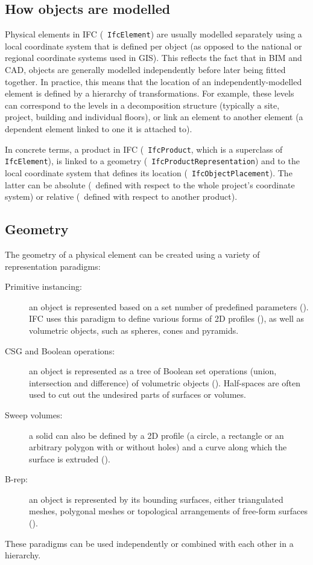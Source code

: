 \subsection{How objects are modelled}

Physical elements in IFC (\ie\ \texttt{IfcElement}) are usually modelled separately using a local coordinate system that is defined per object (as opposed to the national or regional coordinate systems used in GIS).
This reflects the fact that in BIM and CAD, objects are generally modelled independently before later being fitted together.
In practice, this means that the location of an independently-modelled element is defined by a hierarchy of transformations.
For example, these levels can correspond to the levels in a decomposition structure (typically a site, project, building and individual floors), or link an element to another element (a dependent element linked to one it is attached to).

In concrete terms, a product in IFC (\ie\ \texttt{IfcProduct}, which is a superclass of \texttt{IfcElement}), is linked to a geometry (\ie\ \texttt{IfcProductRepresentation}) and to the local coordinate system that defines its location (\ie\ \texttt{IfcObjectPlacement}).
The latter can be absolute (\ie\ defined with respect to the whole project's coordinate system) or relative (\ie\ defined with respect to another product).

\subsection{Geometry}

The geometry of a physical element can be created using a variety of representation paradigms:
\begin{description}
  \item[Primitive instancing:] an object is represented based on a set number of predefined parameters ().
  IFC uses this paradigm to define various forms of 2D profiles (), as well as volumetric objects, such as spheres, cones and pyramids.
  \item[CSG and Boolean operations:] an object is represented as a tree of Boolean set operations (union, intersection and difference) of volumetric objects ().
  Half-spaces are often used to cut out the undesired parts of surfaces or volumes.
  \item[Sweep volumes:] a solid can also be defined by a 2D profile (a circle, a rectangle or an arbitrary polygon with or without holes) and a curve along which the surface is extruded ().
  \item[B-rep:] an object is represented by its bounding surfaces, either triangulated meshes, polygonal meshes or topological arrangements of free-form surfaces ().
\end{description}
These paradigms can be used independently or combined with each other in a hierarchy.

